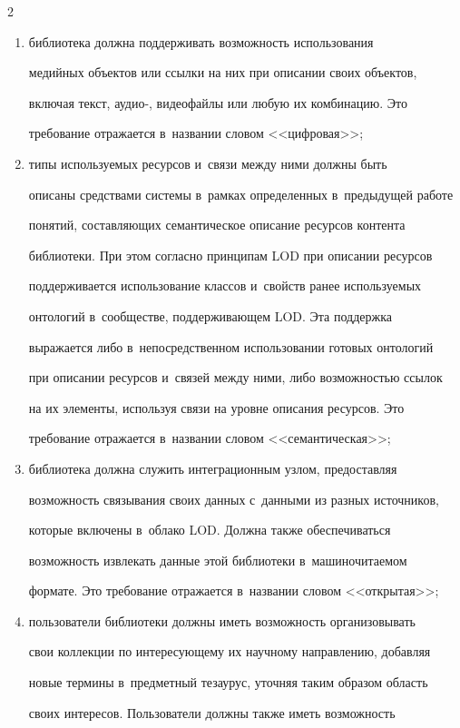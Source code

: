 \begin{multicols}{2}
\begin{enumerate}[(1)]
\item библиотека должна поддерживать возможность использования 

медийных объектов или ссылки на них при описании своих объектов, 

включая текст, аудио-, видеофайлы или любую их комбинацию. Это 

требование отражается в~названии словом <<цифровая>>;

\item типы используемых ресурсов и~связи между ними должны быть 

описаны средствами сис\-те\-мы в~рамках определенных в~предыдущей работе 

понятий, составляющих семантическое описание ресурсов контента 

библиотеки. При этом согласно принципам LOD при описании ресурсов 

поддерживается использование классов и~свойств ранее используемых 

онтологий в~сообществе, поддерживающем LOD. Эта поддержка 

выражается либо в~непосредственном использовании готовых онтологий 

при описании ресурсов и~связей между ними, либо возможностью ссылок 

на их элементы, используя связи на уровне описания ресурсов. Это 

требование отражается в~названии словом <<семантическая>>;

\item библиотека должна служить интеграционным узлом, предоставляя 

возможность связывания своих данных с~данными из разных источников, 

которые включены в~облако LOD. Должна также обеспечиваться 

возможность извлекать данные этой библиотеки в~машиночитаемом 

формате. Это требование отражается в~названии словом <<открытая>>;

\item пользователи библиотеки должны иметь возможность организовывать 

свои коллекции по интересующему их научному направлению, добавляя 

новые термины в~предметный тезаурус, уточняя таким образом область 

своих интересов. Пользователи должны также иметь возможность 


\end{enumerate}
\end{multicols}

